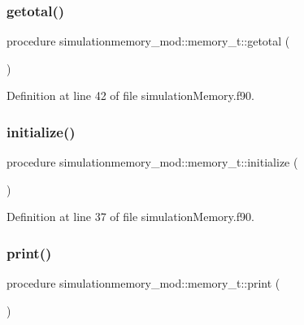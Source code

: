 \subsubsection{\texorpdfstring{getotal()}{getotal()}}
{\footnotesize\ttfamily procedure simulationmemory\+\_\+mod\+::memory\+\_\+t\+::getotal (\begin{DoxyParamCaption}{ }\end{DoxyParamCaption})\hspace{0.3cm}{\ttfamily [private]}}



Definition at line 42 of file simulation\+Memory.\+f90.

\mbox{\label{structsimulationmemory__mod_1_1memory__t_a4a5512e8fc794f1efb4a96815ce5bdad}} 
\subsubsection{\texorpdfstring{initialize()}{initialize()}}
{\footnotesize\ttfamily procedure simulationmemory\+\_\+mod\+::memory\+\_\+t\+::initialize (\begin{DoxyParamCaption}{ }\end{DoxyParamCaption})\hspace{0.3cm}{\ttfamily [private]}}



Definition at line 37 of file simulation\+Memory.\+f90.

\mbox{\label{structsimulationmemory__mod_1_1memory__t_a24c0fb4f4dd83b64e30a8e6213ec459f}} 
\subsubsection{\texorpdfstring{print()}{print()}}
{\footnotesize\ttfamily procedure simulationmemory\+\_\+mod\+::memory\+\_\+t\+::print (\begin{DoxyParamCaption}{ }\end{DoxyParamCaption})\hspace{0.3cm}{\ttfamily [private]}}



